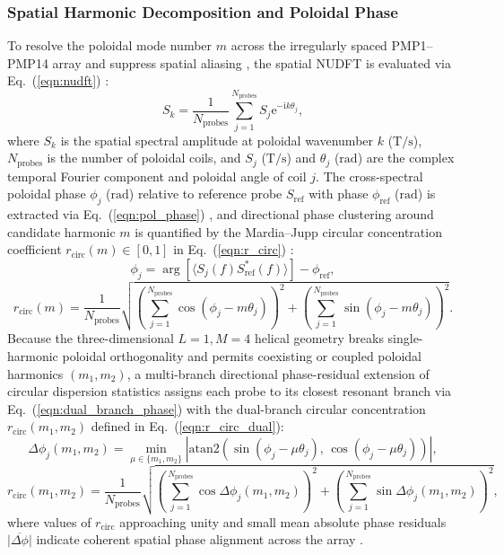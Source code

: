 \subsubsection{Spatial Harmonic Decomposition and Poloidal Phase}
To resolve the poloidal mode number $m$ across the irregularly spaced PMP1--PMP14 array and suppress spatial aliasing \cite{Klein2008}, the spatial NUDFT is evaluated via Eq.~(\ref{eqn:nudft}) \cite{dutt1993fast}:
\begin{equation}
\label{eqn:nudft}
S_k = \frac{1}{N_{\mathrm{probes}}} \sum_{j=1}^{N_{\mathrm{probes}}} S_j \mathrm{e}^{-\mathrm{i} k \theta_j},
\end{equation}
\noindent where $S_k$ is the spatial spectral amplitude at poloidal wavenumber $k$ ($\mathrm{T/s}$), $N_{\mathrm{probes}}$ is the number of poloidal coils, and $S_j$ ($\mathrm{T/s}$) and $\theta_j$ ($\mathrm{rad}$) are the complex temporal Fourier component and poloidal angle of coil $j$. The cross-spectral poloidal phase $\phi_j$ ($\mathrm{rad}$) relative to reference probe $S_{\mathrm{ref}}$ with phase $\phi_{\mathrm{ref}}$ ($\mathrm{rad}$) is extracted via Eq.~(\ref{eqn:pol_phase}) \cite{Smith1971}, and directional phase clustering around candidate harmonic $m$ is quantified by the Mardia--Jupp circular concentration coefficient $r_{\mathrm{circ}}(m) \in [0, 1]$ in Eq.~(\ref{eqn:r_circ}) \cite{mardia2000directional}:
\begin{equation}
\label{eqn:pol_phase}
\phi_j = \arg\left[\langle S_j(f) S_{\mathrm{ref}}^*(f) \rangle\right] - \phi_{\mathrm{ref}},
\end{equation}
\begin{equation}
\label{eqn:r_circ}
r_{\mathrm{circ}}(m) = \frac{1}{N_{\mathrm{probes}}} \sqrt{\left(\sum_{j=1}^{N_{\mathrm{probes}}} \cos(\phi_j - m\theta_j)\right)^2 + \left(\sum_{j=1}^{N_{\mathrm{probes}}} \sin(\phi_j - m\theta_j)\right)^2}.
\end{equation}
Because the three-dimensional $L=1, M=4$ helical geometry breaks single-harmonic poloidal orthogonality and permits coexisting or coupled poloidal harmonics $(m_1, m_2)$, a multi-branch directional phase-residual extension of circular dispersion statistics \cite{mardia2000directional} assigns each probe to its closest resonant branch via Eq.~(\ref{eqn:dual_branch_phase}) with the dual-branch circular concentration $r_{\mathrm{circ}}(m_1, m_2)$ defined in Eq.~(\ref{eqn:r_circ_dual}):
\begin{equation}
\label{eqn:dual_branch_phase}
\Delta\phi_j(m_1, m_2) = \min_{\mu \in \{m_1, m_2\}} \left| \mathrm{atan2}\left(\sin(\phi_j - \mu \theta_j),\, \cos(\phi_j - \mu \theta_j)\right) \right|,
\end{equation}
\begin{equation}
\label{eqn:r_circ_dual}
r_{\mathrm{circ}}(m_1, m_2) = \frac{1}{N_{\mathrm{probes}}} \sqrt{\left(\sum_{j=1}^{N_{\mathrm{probes}}} \cos\Delta\phi_j(m_1, m_2)\right)^2 + \left(\sum_{j=1}^{N_{\mathrm{probes}}} \sin\Delta\phi_j(m_1, m_2)\right)^2},
\end{equation}
\noindent where values of $r_{\mathrm{circ}}$ approaching unity and small mean absolute phase residuals $\overline{|\Delta\phi|}$ indicate coherent spatial phase alignment across the array \cite{mardia2000directional}.

